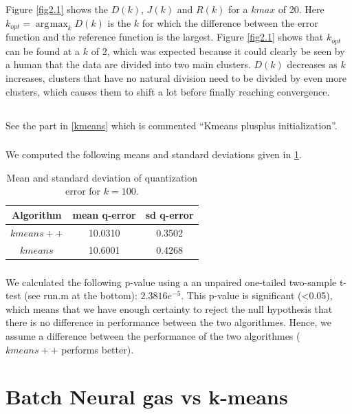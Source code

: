 \documentclass[10pt]{article}
\DeclareMathOperator*{\argmax}{arg\!\max}
\begin{document}
\noindent Figure \ref{fig2.1} shows the $D(k)$, $J(k)$ and $R(k)$ for a $kmax$ of 20. Here $k_{opt} = \argmax_k D(k)$ is the $k$ for which the difference between the error function and the reference function is the largest. Figure \ref{fig2.1} shows that $k_{opt}$ can be found at a $k$ of 2, which was expected because it could clearly be seen by a human that the data are divided into two main clusters. $D(k)$ decreases as $k$ increases, clusters that have no natural division need to be divided by even more clusters, which causes them to shift a lot before finally reaching convergence.

\subsection{}
\subsubsection{}
See the part in \ref{kmeans} which is commented ``Kmeans plusplus initialization''.

\subsubsection{}
We computed the following means and standard deviations given in \ref{tab1}.
\begin{table}[H]
 \centering
 \caption{Mean and standard deviation of quantization error for $k = 100$.}
 \begin{tabular}{c|c|c}
  Algorithm & mean q-error & sd q-error \\
  \hline
  $kmeans++$ & 10.0310 & 0.3502 \\
  $kmeans$ & 10.6001 & 0.4268 
 \end{tabular}
 \label{tab1}
\end{table}

\subsubsection{}
We calculated the following p-value using a an unpaired one-tailed two-sample t-test (see run.m at the bottom): $2.3816e^{-5}$. This p-value is significant (<0.05), which means that we have enough certainty to reject the null hypothesis that there is no difference in performance between the two algorithmes. Hence, we assume a difference between the performance of the two algorithmes ($kmeans++$ performs better).

\section{Batch Neural gas vs k-means}
\end{document}

